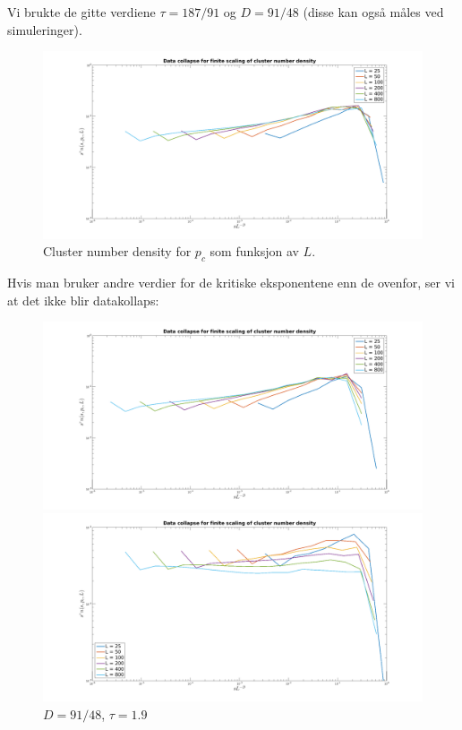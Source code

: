 \documentclass[english, a4paper]{article}
\begin{document}
Vi brukte de gitte verdiene $\tau = 187/91$ og $D = 91/48$ (disse kan også måles ved simuleringer).
\begin{figure}[H]
  \begin{center}
  \includegraphics[width = 140mm]{ndcDataCollapse.png}
  \caption{Cluster number density for $p_c$ som funksjon av $L$.}
  \label{fig:fig1}
  \end{center}
\end{figure}
Hvis man bruker andre verdier for de kritiske eksponentene enn de ovenfor, ser vi at det ikke blir datakollaps:
\begin{figure}[H]
\begin{minipage}[t]{0.48\linewidth}
  \includegraphics[width=\textwidth]{cndDataCollapseD2.png}
  \caption{$D=2.0$, $\tau = 187/91$}
  \label{fig:minipage1}
\end{minipage}
\quad
\begin{minipage}[t]{0.48\linewidth}
\includegraphics[width=\textwidth]{cndDataCollapseTau19.png}
  \caption{$D=91/48$, $\tau = 1.9$}
  \label{fig:minipage1}
\end{minipage}
\end{figure}
\end{document}
